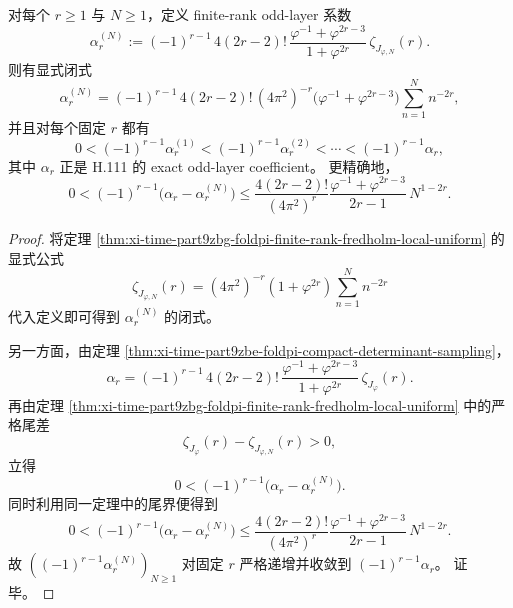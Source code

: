 \begin{theorem}\label{thm:xi-time-part9zbg-foldpi-finite-rank-oddlayer-monotone-approx}
对每个 \(r\ge 1\) 与 \(N\ge 1\)，定义 finite-rank odd-layer 系数
\[
\alpha_r^{(N)}
:=
(-1)^{r-1}\,
4(2r-2)!\,
\frac{\varphi^{-1}+\varphi^{2r-3}}{1+\varphi^{2r}}\,
\zeta_{J_{\varphi,N}}(r).
\]
则有显式闭式
\[
\alpha_r^{(N)}
=
(-1)^{r-1}\,
4(2r-2)!\,(4\pi^2)^{-r}
\bigl(\varphi^{-1}+\varphi^{2r-3}\bigr)
\sum_{n=1}^{N}n^{-2r},
\]
并且对每个固定 \(r\) 都有
\[
0<
(-1)^{r-1}\alpha_r^{(1)}
<
(-1)^{r-1}\alpha_r^{(2)}
<
\cdots
<
(-1)^{r-1}\alpha_r,
\]
其中 \(\alpha_r\) 正是 H.111 的 exact odd-layer coefficient。
更精确地，
\[
0<
(-1)^{r-1}\bigl(\alpha_r-\alpha_r^{(N)}\bigr)
\le
\frac{4(2r-2)!}{(4\pi^2)^r}
\frac{\varphi^{-1}+\varphi^{2r-3}}{2r-1}\,
N^{1-2r}.
\]
\end{theorem}
\begin{proof}
将定理 \ref{thm:xi-time-part9zbg-foldpi-finite-rank-fredholm-local-uniform} 的显式公式
\[
\zeta_{J_{\varphi,N}}(r)
=
(4\pi^2)^{-r}(1+\varphi^{2r})\sum_{n=1}^{N}n^{-2r}
\]
代入定义即可得到 \(\alpha_r^{(N)}\) 的闭式。

另一方面，由定理 \ref{thm:xi-time-part9zbe-foldpi-compact-determinant-sampling}，
\[
\alpha_r
=
(-1)^{r-1}\,
4(2r-2)!\,
\frac{\varphi^{-1}+\varphi^{2r-3}}{1+\varphi^{2r}}\,
\zeta_{J_\varphi}(r).
\]
再由定理 \ref{thm:xi-time-part9zbg-foldpi-finite-rank-fredholm-local-uniform} 中的严格尾差
\[
\zeta_{J_\varphi}(r)-\zeta_{J_{\varphi,N}}(r)>0,
\]
立得
\[
0<
(-1)^{r-1}\bigl(\alpha_r-\alpha_r^{(N)}\bigr).
\]
同时利用同一定理中的尾界便得到
\[
0<
(-1)^{r-1}\bigl(\alpha_r-\alpha_r^{(N)}\bigr)
\le
\frac{4(2r-2)!}{(4\pi^2)^r}
\frac{\varphi^{-1}+\varphi^{2r-3}}{2r-1}\,
N^{1-2r}.
\]
故 \(((-1)^{r-1}\alpha_r^{(N)})_{N\ge 1}\) 对固定 \(r\) 严格递增并收敛到 \((-1)^{r-1}\alpha_r\)。
证毕。
\end{proof}

